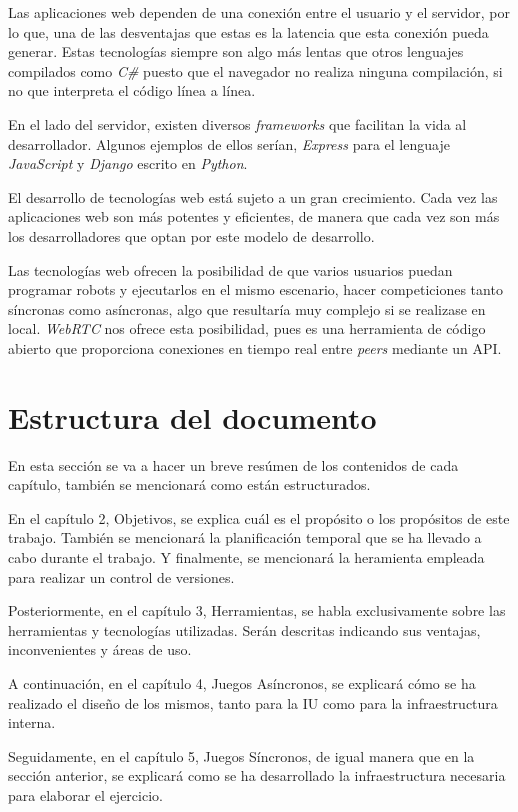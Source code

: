 \documentclass[a4paper, 12pt]{book}
\begin{document}
Las aplicaciones web dependen de una conexión entre el usuario y el servidor, por lo que, una de las desventajas que estas es la latencia que esta conexión pueda generar. Estas tecnologías siempre son algo más lentas que otros lenguajes compilados como \emph{C\#} puesto que el navegador no realiza ninguna compilación, si no que interpreta el código línea a línea.

En el lado del servidor, existen diversos \emph{frameworks} que facilitan la vida al desarrollador. Algunos ejemplos de ellos serían, \emph{Express} para el lenguaje \emph{JavaScript} y \emph{Django} escrito en \emph{Python}.

El desarrollo de tecnologías web está sujeto a un gran crecimiento. Cada vez las aplicaciones web son más potentes y eficientes, de manera que cada vez son más los desarrolladores que optan por este modelo de desarrollo.

Las tecnologías web ofrecen la posibilidad de que varios usuarios puedan programar robots y ejecutarlos en el mismo escenario, hacer competiciones tanto síncronas como asíncronas, algo que resultaría muy complejo si se realizase en local. \emph{WebRTC} nos ofrece esta posibilidad, pues es una herramienta de código abierto que proporciona conexiones en tiempo real entre \emph{peers} mediante un API.

\section{Estructura del documento}

En esta sección se va a hacer un breve resúmen de los contenidos de cada capítulo, también se mencionará como están estructurados.

En el capítulo 2, Objetivos, se explica cuál es el propósito o los propósitos de este trabajo. También se mencionará la planificación temporal que se ha llevado a cabo durante el trabajo. Y finalmente, se mencionará la heramienta empleada para realizar un control de versiones.

Posteriormente, en el capítulo 3, Herramientas, se habla exclusivamente sobre las herramientas y tecnologías utilizadas. Serán descritas indicando sus ventajas, inconvenientes y áreas de uso.

A continuación, en el capítulo 4, Juegos Asíncronos, se explicará cómo se ha realizado el diseño de los mismos, tanto para la IU como para la infraestructura interna.

Seguidamente, en el capítulo 5, Juegos Síncronos, de igual manera que en la sección anterior, se explicará como se ha desarrollado la infraestructura necesaria para elaborar el ejercicio.
\end{document}
